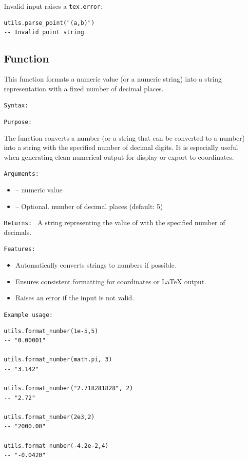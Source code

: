 Invalid input raises a \texttt{tex.error}:

\begin{verbatim}
utils.parse_point("(a,b)")
-- Invalid point string
\end{verbatim}



\subsection{Function }
\label{sub:function_utils_format_number}

This function formats a numeric value (or a numeric string) into a string representation with a fixed number of decimal places.

\texttt{Syntax: }

\begin{center}
\end{center}

\texttt{Purpose: }

The function converts a number (or a string that can be converted to a number) into a string with the specified number of decimal digits. It is especially useful when generating clean numerical output for display or export to \TIKZ{} coordinates.

\texttt{Arguments: }

\begin{itemize}
\item {} – numeric value
\item {} – Optional. number of decimal places (default: 5)
\end{itemize}

\texttt{Returns: } A string representing the value of  with the specified number of decimals.

\texttt{Features: }

\begin{itemize}
\item Automatically converts strings to numbers if possible.
\item Ensures consistent formatting for \TIKZ{} coordinates or LaTeX output.
\item Raises an error if the input is not valid.
\end{itemize}

\texttt{Example usage: }

\begin{verbatim}
utils.format_number(1e-5,5)
-- "0.00001"

utils.format_number(math.pi, 3)
-- "3.142"

utils.format_number("2.718281828", 2)
-- "2.72"

utils.format_number(2e3,2)
-- "2000.00"

utils.format_number(-4.2e-2,4)
-- "-0.0420"
\end{verbatim}



